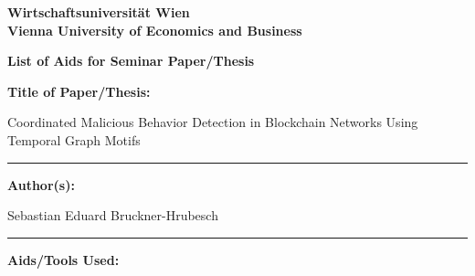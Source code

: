 
\clearpage
\begingroup
\renewcommand{\baselinestretch}{1.0}\normalsize
\setlength{\parindent}{0pt}
\pagestyle{plain}

\begin{center}
    \textbf{Wirtschaftsuniversität Wien} \\
    \textbf{Vienna University of Economics and Business}
\end{center}

\vspace{1cm}

\begin{center}
    \textbf{List of Aids for Seminar Paper/Thesis}
\end{center}

\vspace{1cm}

\textbf{Title of Paper/Thesis:}\par
{\raggedright
Coordinated Malicious Behavior Detection in Blockchain Networks Using
Temporal Graph Motifs\par}
\rule{\linewidth}{0.4pt}

\vspace{1cm}

\textbf{Author(s):}\par
Sebastian Eduard Bruckner-Hrubesch\par
\rule{\linewidth}{0.4pt}

\vspace{1cm}

\textbf{Aids/Tools Used:}

